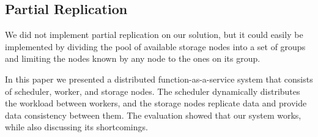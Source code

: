 \documentclass[times, 10pt,twocolumn]{article}
\begin{document}
\subsection{Partial Replication}

We did not implement partial replication on our solution, but it could easily be implemented by dividing the pool of available storage nodes into a set of groups and limiting
the nodes known by any node to the ones on its group. 


In this paper we presented a distributed function-as-a-service system that consists of scheduler, worker, and storage nodes.
The scheduler dynamically distributes the workload between workers, and the storage nodes replicate data and provide data consistency between them.
The evaluation showed that our system works, while also discussing its shortcomings.

\nocite{ex1,ex2}


\end{document}
